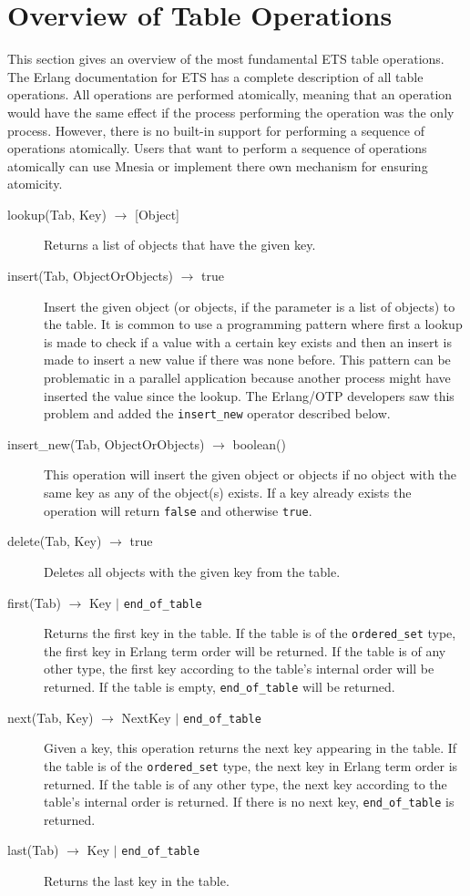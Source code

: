 \documentclass[aps,pre,preprint,nofootinbib]{revtex4}
\begin{document}
\section{Overview of Table Operations}

This section gives an overview of the most fundamental ETS table operations.
The Erlang documentation for ETS has a complete description of all table operations.
All operations are performed atomically, meaning that an operation would have the same effect if the process performing the operation was the only process.
However, there is no built-in support for performing a sequence of operations atomically.
Users that want to perform a sequence of operations atomically can use Mnesia or implement there own mechanism for ensuring atomicity.

\begin{description}
\item[lookup(Tab, Key) $\rightarrow$ {[Object]}]
  Returns a list of objects that have the given key.
\item[insert(Tab, ObjectOrObjects) $\rightarrow$ true]
  Insert the given object (or objects, if the parameter is a list of objects) to the table.
  It is common to use a programming pattern where first a lookup is made to check if a value with a certain key exists and then an insert is made to insert a new value if there was none before.
  This pattern can be problematic in a parallel application because another process might have inserted the value since the lookup.
  The Erlang/OTP developers saw this problem and added the \verb|insert_new| operator described below. 
\item[insert\_new(Tab, ObjectOrObjects) $\rightarrow$ boolean()]
  This operation will insert the given object or objects if no object with the same key as any of the object(s) exists.
  If a key already exists the operation will return \verb|false| and otherwise \verb|true|.
\item[delete(Tab, Key) $\rightarrow$ true]
  Deletes all objects with the given key from the table.
\item[first(Tab) $\rightarrow$ Key $|$ \texttt{end\_of\_table}]
  Returns the first key in the table.
  If the table is of the \verb|ordered_set| type, the first key in Erlang term order will be returned.
  If the table is of any other type, the first key according to the table's internal order will be returned.
  If the table is empty, \verb|end_of_table| will be returned.
\item[next(Tab, Key) $\rightarrow$ NextKey $|$ \texttt{end\_of\_table}]
  Given a key, this operation returns the next key appearing in the table.
  If the table is of the \verb|ordered_set| type, the next key in Erlang term order is returned.
  If the table is of any other type, the next key according to the table's internal order is returned.
  If there is no next key, \texttt{end\_of\_table} is returned.
\item[last(Tab) $\rightarrow$ Key $|$ \texttt{end\_of\_table}] Returns the last key in the table.
\end{description}
\end{document}
